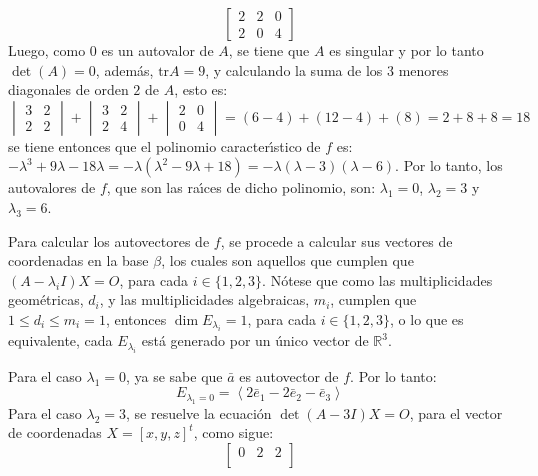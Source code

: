 \begin{solucion}
\begin{enumerate}[$a$)]
\begin{equation*}
\begin{bmatrix}
    2 & 2 & 0 \\
    2 & 0 & 4
   \end{bmatrix}
  \end{equation*}
  Luego, como $0$ es un autovalor de $A$, se tiene que $A$ es singular y por lo tanto $\det(A) = 0$, adem\'as, $\text{tr} A = 9$, y calculando la suma de los 3 menores diagonales de orden $2$ de $A$, esto es:
  \begin{equation*}
   \begin{vmatrix}
    3 & 2 \\
    2 & 2 
   \end{vmatrix}
   +
   \begin{vmatrix}
    3 & 2 \\
    2 & 4 
   \end{vmatrix}
   + 
   \begin{vmatrix}
    2 & 0 \\
    0 & 4
   \end{vmatrix}
   = (6-4) + (12 - 4) + (8) = 2+8+8 = 18
  \end{equation*}
  se tiene entonces que el polinomio caracter\'{\i}stico de $f$ es: $-\lambda^3 + 9\lambda - 18\lambda = -\lambda(\lambda^2 - 9\lambda +18) = -\lambda(\lambda -3)(\lambda - 6)$. Por lo tanto, los autovalores de $f$, que son las ra\'{\i}ces de dicho polinomio, son: $\lambda_1 = 0$, $\lambda_2 = 3$ y $\lambda_3 = 6$.
  \par 
  Para calcular los autovectores de $f$, se procede a calcular sus vectores de coordenadas en la base $\beta$, los cuales son aquellos que cumplen que $(A-\lambda_i I) X = O$, para cada $i\in \{ 1, 2, 3\}$. N\'otese que como las multiplicidades geom\'etricas, $d_i$, y las multiplicidades algebraicas, $m_i$, cumplen que $1\leq d_i \leq m_i = 1$, entonces $\dim E_{\lambda_i} = 1$, para cada $i\in\{1,2,3\}$, o lo que es equivalente, cada $E_{\lambda_i}$ est\'a generado por un \'unico vector de $\mathbb{R}^3$.
  \par 
  Para el caso $\lambda_1 = 0$, ya se sabe que $\bar{a}$ es autovector de $f$. Por lo tanto:
  \begin{equation*}
   E_{\lambda_1 = 0} = \left< 2\bar{e}_1 - 2\bar{e}_2 - \bar{e}_3 \right>
  \end{equation*}
  Para el caso $\lambda_2 = 3$, se resuelve la ecuaci\'on $\det(A-3I)X = O$, para el vector de coordenadas $X=[x,y,z]^t$, como sigue:
  \begin{equation*}
   \begin{bmatrix}
    0 &  2 & 2 \\

\end{bmatrix}
\end{equation*}
\end{enumerate}
\end{solucion}
